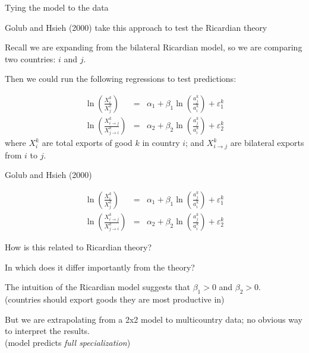 \documentclass[notes,11pt, aspectratio=169, xcolor=table]{beamer}
\newenvironment{wideitemize}{\itemize\addtolength{\itemsep}{10pt}}{\enditemize}
\begin{document}
\begin{frame}{Tying the model to the data}

\begin{wideitemize}
    \item<1-> Golub and Hsieh (2000) take this approach to test the Ricardian theory

    \item<2-> Recall we are expanding from the bilateral Ricardian model, so we are comparing two countries: $i$ and $j$.

    \item<3-> Then we could run the following regressions to test predictions:

    \begin{eqnarray*}
        \ln \left( \frac{X_{i}^k}{X_{j}^k} \right) &=& \alpha_1 + \beta_1 \ln \left(\frac{a_{j}^k}{a_{i}^k} \right) + \varepsilon_1^k \\
        \ln \left( \frac{X_{i\to j}^k}{X_{j \to i}^k} \right) &=& \alpha_2 + \beta_2 \ln \left(\frac{a_{j}^k}{a_{i}^k} \right) + \varepsilon_2^k 
    \end{eqnarray*}
    where $X_{i}^k$ are total exports of good $k$ in country $i$; and $X_{i\to j}^k$ are bilateral exports from $i$ to $j$.
    
    
\end{wideitemize}

    
\end{frame}

\begin{frame}{Golub and Hsieh (2000)}

    \begin{eqnarray*}
        \ln \left( \frac{X_{i}^k}{X_{j}^k} \right) &=& \alpha_1 + \beta_1 \ln \left(\frac{a_{j}^k}{a_{i}^k} \right) + \varepsilon_1^k \\
        \ln \left( \frac{X_{i\to j}^k}{X_{j \to i}^k} \right) &=& \alpha_2 + \beta_2 \ln \left(\frac{a_{j}^k}{a_{i}^k} \right) + \varepsilon_2^k 
    \end{eqnarray*}
    
    \begin{wideitemize}

    \item<1-> How is this related to Ricardian theory?

    \item<2-> In which does it differ importantly from the theory?

    \item<3-> The intuition of the Ricardian model suggests that $\beta_1 > 0$ and $\beta_2 > 0$. \\
        \qquad (countries should export goods they are most productive in)
    
    \item<4-> But we are extrapolating from a 2x2 model to multicountry data; no obvious way to interpret the results. \\
        \qquad (model predicts \textit{full specialization})

\end{wideitemize}

\end{frame}
\end{document}
